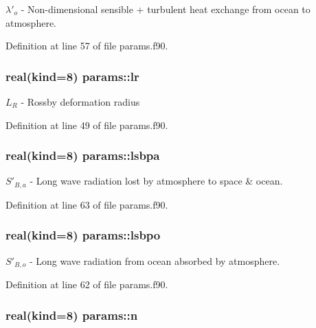 $\lambda'_o$ -\/ Non-\/dimensional sensible + turbulent heat exchange from ocean to atmosphere. 



Definition at line 57 of file params.\-f90.

\hypertarget{classparams_a3082530044275cbd794604b81a7e6be0}{
\subsubsection[{lr}]{\setlength{\rightskip}{0pt plus 5cm}real(kind=8) params\-::lr}}\label{classparams_a3082530044275cbd794604b81a7e6be0}


$L_R$ -\/ Rossby deformation radius 



Definition at line 49 of file params.\-f90.

\hypertarget{classparams_a2422205ab99f9886746672ee91b775a8}{
\subsubsection[{lsbpa}]{\setlength{\rightskip}{0pt plus 5cm}real(kind=8) params\-::lsbpa}}\label{classparams_a2422205ab99f9886746672ee91b775a8}


$S'_{B,a}$ -\/ Long wave radiation lost by atmosphere to space \& ocean. 



Definition at line 63 of file params.\-f90.

\hypertarget{classparams_ae29ef1b81e159c7bff47aa8303710583}{
\subsubsection[{lsbpo}]{\setlength{\rightskip}{0pt plus 5cm}real(kind=8) params\-::lsbpo}}\label{classparams_ae29ef1b81e159c7bff47aa8303710583}


$S'_{B,o}$ -\/ Long wave radiation from ocean absorbed by atmosphere. 



Definition at line 62 of file params.\-f90.

\hypertarget{classparams_abe66e904e07861ba1ef258ee92184e88}{
\subsubsection[{n}]{\setlength{\rightskip}{0pt plus 5cm}real(kind=8) params\-::n}}\label{classparams_abe66e904e07861ba1ef258ee92184e88}


